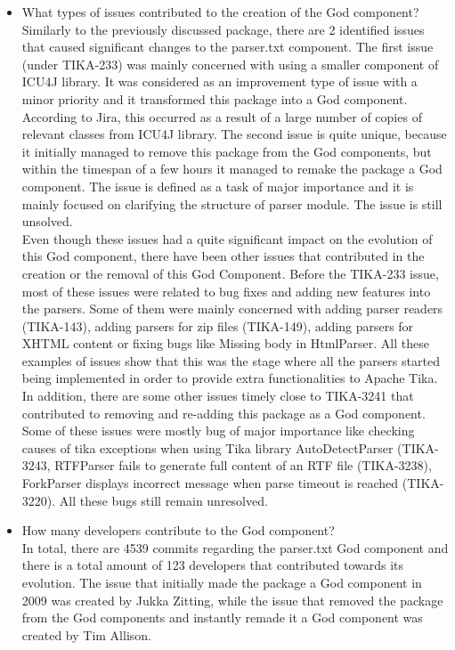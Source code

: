 \documentclass{article}
\begin{document}
\begin{itemize}
    \item	What types of issues contributed to the creation of the God component?\\
    
    Similarly to the previously discussed package, there are 2 identified issues that caused significant changes to the parser.txt component. The first issue (under TIKA-233) was mainly concerned with using a smaller component of ICU4J library. It was considered as an improvement type of issue with a minor priority and it transformed this package into a God component. According to Jira, this occurred as a result of a large number of copies of relevant classes from ICU4J library. The second issue is quite unique, because it initially managed to remove this package from the God components, but within the timespan of a few hours it managed to remake the package a God component. The issue is defined as a task of major importance and it is mainly focused on clarifying the structure of parser module. The issue is still unsolved.\\
    Even though these issues had a quite significant impact on the evolution of this God component, there have been other issues that contributed in the creation or the removal of this God Component. Before the TIKA-233 issue, most of these issues were related to bug fixes and adding new features into the parsers. Some of them were mainly concerned with adding parser readers (TIKA-143), adding parsers for zip files (TIKA-149), adding parsers for XHTML content or fixing bugs like Missing body in HtmlParser. All these examples of issues show that this was the stage where all the parsers started being implemented in order to provide extra functionalities to Apache Tika. In addition, there are some other issues timely close to TIKA-3241 that contributed to removing and re-adding this package as a God component. Some of these issues were mostly bug of major importance like checking causes of tika exceptions when using  Tika library AutoDetectParser (TIKA-3243, RTFParser fails to generate full content of an RTF file (TIKA-3238), ForkParser displays incorrect message when parse timeout is reached (TIKA-3220). All these bugs still remain unresolved.
    \item How many developers contribute to the God component?\\
    In total, there are 4539 commits regarding the parser.txt God component and there is a total amount of 123 developers that contributed towards its evolution. The issue that initially made the package a God component in 2009 was created by Jukka Zitting, while the issue that removed the package from the God components and instantly remade it a God component was created by Tim Allison. \\

\end{itemize}
\end{document}
